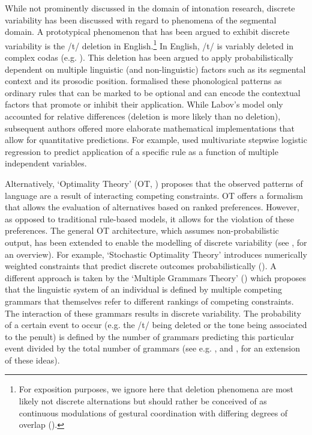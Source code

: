 While not prominently discussed in the domain of intonation research, discrete variability has been discussed with regard to phenomena of the segmental domain. A prototypical phenomenon that has been argued to exhibit discrete variability is the /t/ deletion in English.\footnote{For exposition purposes, we ignore here that deletion phenomena are most likely not discrete alternations but should rather be conceived of as continuous modulations of gestural coordination with differing degrees of overlap (\citealt{BrowmanGoldstein1986}).} In English, /t/ is variably deleted in complex codas (e.g. \citealt{Guy1980}). This deletion has been argued to apply probabilistically dependent on multiple linguistic (and non-linguistic) factors such as its segmental context and its prosodic position. \citet{Labov1969} formalised these phonological patterns as ordinary rules that can be marked to be optional and can encode the contextual factors that promote or inhibit their application. While Labov’s model only accounted for relative differences (deletion is more likely than no deletion), subsequent authors offered more elaborate mathematical implementations that allow for quantitative predictions. For example, \citet{Sankoff.etal2005} used multivariate stepwise logistic regression to predict application of a specific rule as a function of multiple independent variables. 

Alternatively, ‘Optimality Theory’ (OT, \citealt{PrinceSchmolensky1993}) proposes that the observed patterns of language are a result of interacting competing constraints. OT offers a formalism that allows the evaluation of alternatives based on ranked preferences. However, as opposed to traditional rule-based models, it allows for the violation of these preferences. The general OT architecture, which assumes non-probabilistic output, has been extended to enable the modelling of discrete variability (see \citealt{Anttila2012}, for an overview). For example, ‘Stochastic Optimality Theory’ introduces numerically weighted constraints that predict discrete outcomes probabilistically (\citealt{Boersma1997,BoersmaHayes2001}). A different approach is taken by the ‘Multiple Grammars Theory’ (\citealt{Kroch1989,Kiparsky1993}) which proposes that the linguistic system of an individual is defined by multiple competing grammars that themselves refer to different rankings of competing constraints. The interaction of these grammars results in discrete variability. The probability of a certain event to occur (e.g. the /t/ being deleted or the tone being associated to the penult) is defined by the number of grammars predicting this particular event divided by the total number of grammars (see e.g. \citealt{Reynolds1994}, and \citealt{Anttila1997}, for an extension of these ideas). 

